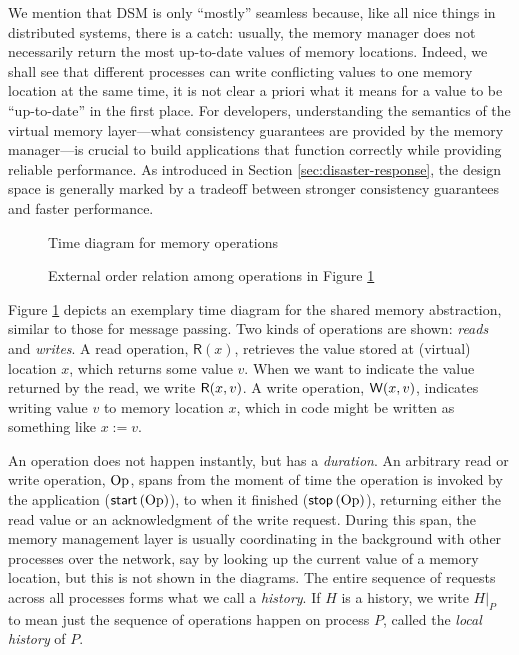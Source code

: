 \documentclass[]             %
{NASA}                       %
\theoremstyle{definition}
\begin{document}
We mention that DSM is only ``mostly'' seamless because, like all nice
things in distributed systems, there is a catch: usually, the memory
manager does not necessarily return the most up-to-date values of
memory locations. Indeed, we shall see that different processes can
write conflicting values to one memory location at the same time, it
is not clear a priori what it means for a value to be ``up-to-date''
in the first place. For developers, understanding the semantics of the
virtual memory layer---what consistency guarantees are provided by the
memory manager---is crucial to build applications that function
correctly while providing reliable performance. As introduced in
Section \ref{sec:disaster-response}, the design space is generally
marked by a tradeoff between stronger consistency guarantees and
faster performance.

\begin{figure}
    \centering
    
    \caption{Time diagram for memory operations}
    \label{fig:dsm-example-1}
\end{figure}

\begin{figure}
  \centering
  
  \caption{External order relation among operations in Figure \ref{fig:dsm-example-1}}
  \label{fig:dsm-example-1DAG}
\end{figure}

Figure \ref{fig:dsm-example-1} depicts an exemplary time diagram for the
shared memory abstraction, similar to those for message passing. Two
kinds of operations are shown: \emph{reads} and \emph{writes}. A read
operation, $\mathsf{R}(x)$, retrieves the value stored at (virtual)
location $x$, which returns some value $v$. When we want to indicate
the value returned by the read, we write $\mathsf{R}\!\left(x, v\right)$. A write
operation, $\mathsf{W}\!\left(x, v\right)$, indicates writing value $v$ to memory
location $x$, which in code might be written as something like
$x := v$.

An operation does not happen instantly, but has a \emph{duration}. An
arbitrary read or write operation, $\mathrm{Op}$, spans from the moment of
time the operation is invoked by the application ($\mathsf{start}\left(\mathrm{Op}\right)$),
to when it finished ($\mathsf{stop}\left(\mathrm{Op}\right)$), returning either the read value
or an acknowledgment of the write request. During this span, the
memory management layer is usually coordinating in the background with
other processes over the network, say by looking up the current value
of a memory location, but this is not shown in the diagrams. The
entire sequence of requests across all processes forms what we call a
\emph{history}. If $H$ is a history, we write $H|_P$ to mean just the
sequence of operations happen on process $P$, called the \emph{local
  history} of $P$.
\end{document}
